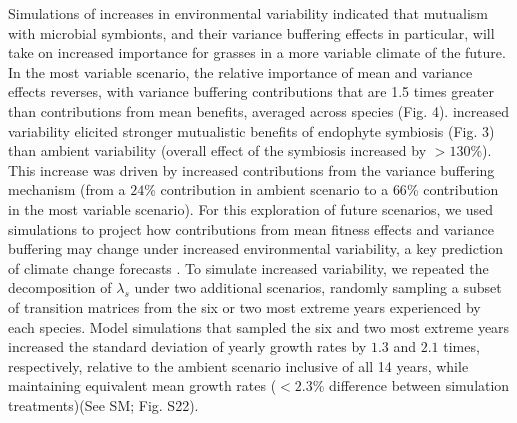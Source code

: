 \documentclass[12pt]{article}
\begin{document}
Simulations of increases in environmental variability indicated that mutualism with microbial symbionts, and their variance buffering effects in particular, will take on increased importance for grasses in a more variable climate of the future.
In the most variable scenario, the relative importance of mean and variance effects reverses, with variance buffering contributions that are 1.5 times greater than contributions from mean benefits, averaged across species (Fig. 4). 
 increased variability elicited stronger mutualistic benefits of endophyte symbiosis (Fig. 3) than ambient variability (overall effect of the symbiosis increased by $>130 $\%).
This increase was driven by increased contributions from the variance buffering mechanism (from a $24$\% contribution in ambient scenario to a $66$\% contribution in the most variable scenario). 
For this exploration of future scenarios, we used simulations to project how contributions from mean fitness effects and variance buffering may change under increased environmental variability, a key prediction of climate change forecasts \cite{stocker2013technical}.
To simulate increased variability, we repeated the decomposition of $\lambda_s$ under two additional scenarios, randomly sampling a subset of transition matrices from the six or two most extreme years experienced by each species. 
Model simulations that sampled the six and two most extreme years increased the standard deviation of yearly growth rates by $1.3$ and $2.1$ times, respectively, relative to the ambient scenario inclusive of all 14 years, while maintaining equivalent mean growth rates ($<2.3$\% difference between simulation treatments)(See SM; Fig. S22).
\end{document}
